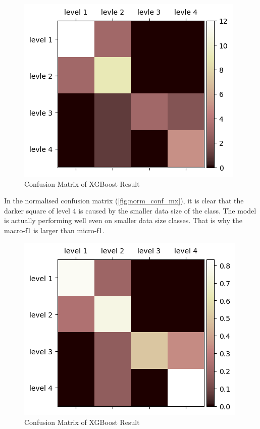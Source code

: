 \documentclass[10pt, a4paper, twocolumn]{article} %
\begin{document}
\begin{figure}
	\includegraphics[width=\linewidth]{fig/conf_mx.png} 
	\caption{Confusion Matrix of XGBoost Result} 
	\label{fig:conf_mx} 
\end{figure}

In the normalised confusion matrix (\autoref{fig:norm_conf_mx}), it is clear that the darker square of level 4 is caused by the smaller 
data size of the class. The model is actually performing well even on smaller data size classes. That is why 
the macro-f1 is larger than micro-f1.\\[5pt]
\begin{figure}
	\includegraphics[width=\linewidth]{fig/norm_conf_mx.png} 
	\caption{Confusion Matrix of XGBoost Result} 
	\label{fig:norm_conf_mx} 
\end{figure}
\end{document}

